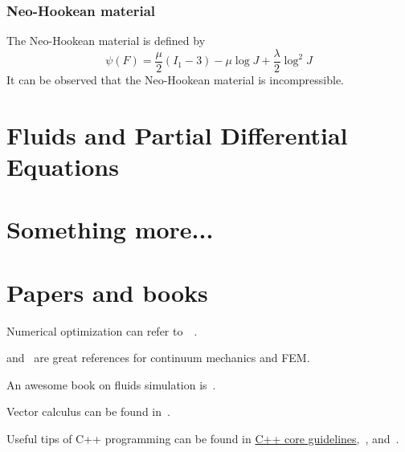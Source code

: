 \documentclass{fancydoc}
\begin{document}
\subsubsection{Neo-Hookean material}
The Neo-Hookean material is defined by
\begin{equation}
\psi(F) = \frac{\mu}{2}(I_1 - 3) - \mu \log J + \frac{\lambda}{2}\log^2 J
\end{equation}
It can be observed that the Neo-Hookean material is incompressible.


\section{Fluids and Partial Differential Equations}

\section{Something more...}

\section{Papers and books}

Numerical optimization can refer to~\cite{boyd2004convex}~\cite{nocedal2006numerical}.

\cite{bonet1997nonlinear} and~\cite{sifakis2012fem} are great references for continuum mechanics and FEM.

An awesome book on fluids simulation is~\cite{bridson2015fluid}.

Vector calculus can be found in~\cite{petersen2008matrix}.

Useful tips of C++ programming can be found in \href{https://github.com/isocpp/CppCoreGuidelines}{C++ core guidelines},~\cite{meyers2005effective}, and~\cite{meyers2014effective}.


 
\end{document}
